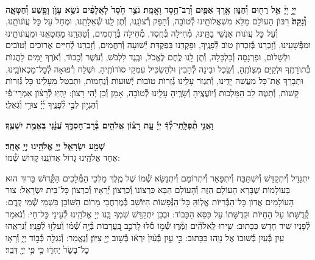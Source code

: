 \documentclass[twoside, openany, parskip=half, 11pt]{book}
\begin{document}
\begin{sometimes}

\\
 \textbf{יְיָ֣ יְיָ֔ אֵ֥ל רַח֖וּם וְ֯חַנּ֑וּן אֶ֥רֶךְ אַפַּ֖יִם וְ֯רַב־חֶ֥סֶד וֶאֱמֶֽת׃ נֹצֵ֥ר חֶ֙סֶד֙ לָאֲלָפִ֔ים נֹשֵׂ֥א עָוֺ֛ן וָפֶ֖שַׁע וְ֯חַטָּאָ֑ה וְ֯נַקֵּה֙׃}
רִבּוֺן הָעוׂלָם מַלֵּא מִשְׁאֲלוׂתֵֽינוּ לְ֯טוׂבָה, וְ֯הָפֵק רְ֯צוׂנֵֽנוּ, וְ֯תֶן לָֽנוּ שְׁ֯אֵלָתֵֽנוּ, וּמְחַל עַל כׇּל עֲוׂנוׂתֵֽנוּ, וְ֯עַל כׇּל עֲוׂנוׂת אַנְשֵׁי בָתֵּֽינוּ, מְ֯חִילָה בְּ֯חֶֽסֶד, מְ֯חִילָה בְּ֯רַחֲמִים, וְ֯טַהֲרֵֽנוּ מֵחֲטָאֵֽנוּ וּמֵעֲוׂנוׂתֵֽינוּ וּמִפְּ֯שָׁעֵֽינוּ, וְ֯זׇכְרֵנוּ בְּ֯זִכְרוׂן טוׂב לְ֯פָנֶֽיךָ, וּפׇקְדֵֽנוּ בִּפְקֻדַּת יְ֯שׁוּעָה וְ֯רַחֲמִים, וְ֯זׇכְרֵֽנוּ לְ֯חַיִּים אֲרוּכִים וְ֯טוׂבִים וּלְשָׁלוׂם, וּפַרְנָסָה וְ֯כַלְכָּלָה, וְ֯תֶן לָֽנוּ לֶֽחֶם לֶאֱכׂל, וּבֶֽגֶד לִלְבּׂשׁ, וְ֯עׂשֶׁר וְ֯כָבוׂד, וְ֯אׂרֶךְ יָמִים לַהֲגוׂת בְּ֯תוׂרָתֶֽךָ וּלְקַיֵּם מִצְוׂתֶֽהָ, וְ֯שֵֽׂכֶל וּבִינָה לְ֯הָבִין וּלְהַשְׂכִּיל עִמְקֵי סוׂדוׂתֶֽיהָ, וּשְׁלַח רְ֯פוּאָה לְ֯כׇל־מַכְאוׂבֵֽינוּ, וּתְבָרֵךְ אֶת־כָּל מַעֲשֵׁה יָדֵֽינוּ, וְ֯תִגְזׂר עָלֵֽינוּ גְּ֯זֵרוׂת טוׂבוׂת יְ֯שׁוּעוׂת וְ֯נֶחָמוׂת, וּתְבַטֵּל מֵעָלֵֽינוּ כׇּל גְּ֯זֵרוׂת קָשׁוׂת, וְ֯תַטֶּה לֵב הַמַּלְכוּת וְ֯יוׂעֲצֶֽיהָ וְ֯שָׂרֶֽיהָ עָלֵֽינוּ לְ֯טוׂבָה, אָמֵן וְ֯כֵן יְ֯הִי רָצוׂן:
%
יִ֥הְיֽוּ לְ֯רָצ֨וֹן אִמְרֵי־פִ֡י וְ֯הֶגְי֣וֹן לִבִּ֣י לְ֯פָנֶ֑יךָ יְ֜יָ֗ צוּרִ֥י וְ֯גֹֽאֲלִֽי׃


\textbf{וַאֲנִ֤י תְ֯פִלָּֽתִי־לְ֯ךָ֨ יְיָ֡ עֵ֤ת רָצ֗וֹן אֱלֹהִ֥ים בְּ֯רָב־חַסְדֶּ֑ךָ עֲ֝נֵ֗נִי בֶּאֱמֶ֥ת יִשְׁעֶֽךָ׃}

\end{sometimes}

\brikhshmei

\textbf{שְׁמַ֖ע יִשְׂרָאֵ֑ל יְיָ֥ אֱלֹהֵ֖ינוּ יְיָ֥ אֶחָֽד׃}\\

אֶחָד אֱלֹהֵֽינוּ גָּדוֹל אֲדוֹנֵֽנוּ קָדוֹשׁ שְׁ֯מוֹ:

\gadlu

\label{al hakol}
יִתְגַּדַּל וְ֯יִתְקַדַּשׁ וְ֯יִשְׁתַּבַּח וְ֯יִתְפָּאַר וְ֯יִתְרוֹמַם וְ֯יִתְנַשֵּׂא שְׁ֯מוֹ שֶׁל מֶֽלֶךְ מַלְכֵי הַמְּ֯לָכִים הַקְָּ֯דוֹשׁ בָּרוּךְ הוּא בָּעוֹלָמוֹת שֶׁבָּרָא הָעוֹלָם הַזֶּה וְ֯הָעוֹלָם הַבָּא כִּרְצוֹנוֹ וְ֯כִרְצוֹן יְ֯רֵאָיו וְ֯כִרְצוֹן כׇּל־בֵּית יִשְׂרָאֵל: צוּר הָעוֹלָמִים אֲדוֹן כׇּל־הַבְּ֯רִיּוֹת אֱלֽוֹהַּ כׇּל־הַנְּ֯פָשׁוֹת הַיּוֹשֵׁב בְּ֯מֶרְחֲבֵי מָרוֹם הַשּׁוֹכֵן בִּשְׁמֵי שְׁ֯מֵי קֶֽדֶם: קְ֯דֻשָּׁתוֹ עַל הַחַיּוֹת וּקְדֻשָּׁתוֹ עַל כִּסֵּא הַכָּבוֹד: וּבְכֵן יִתְקַדַּשׁ שִׁמְךָ בָּֽנוּ יְיָ אֱלֹהֵֽינוּ לְ֯עֵינֵי כׇּל־חָי: וְ֯נֹאמַר לְ֯פָנָיו שִׁיר חָדָשׁ כַּכָּתוּב:
שִׁ֥ירוּ לֵֽאלֹהִֽ֘ים זַמְּ֯ר֢וּ שְׁ֯֫מ֥וֹ סֹ֡לּוּ לָֽרֹכֵ֣ב בָּֽ֭עֲרָבוֹת בְּ֯יָ֥הּ שְׁ֯֝מ֗וֹ וְ֯עִלְז֥וּ לְ֯פָנָֽיו׃ וְ֯נִרְאֵֽהוּ עַֽיִן בְּ֯עַֽיִן בְּ֯שׁוּבוֹ אֶל נָוֵֽהוּ כַּכָּתוּב:
%
כִּ֣י עַ֤יִן בְּ֯עַ֨יִן֙ יִרְא֔וּ בְּ֯שׁ֥וּב יְיָ֖ צִיּֽוֹן׃ וְ֯נֶאֱמַר:
וְ֯נִגְלָ֖ה כְּ֯ב֣וֹד יְיָ֑ וְ֯רָא֤וּ כׇל־בָּשָׂר֙ יַחְדָּ֔ו כִּ֛י פִּ֥י יְיָ֖ דִּבֵּֽר׃
\end{document}
